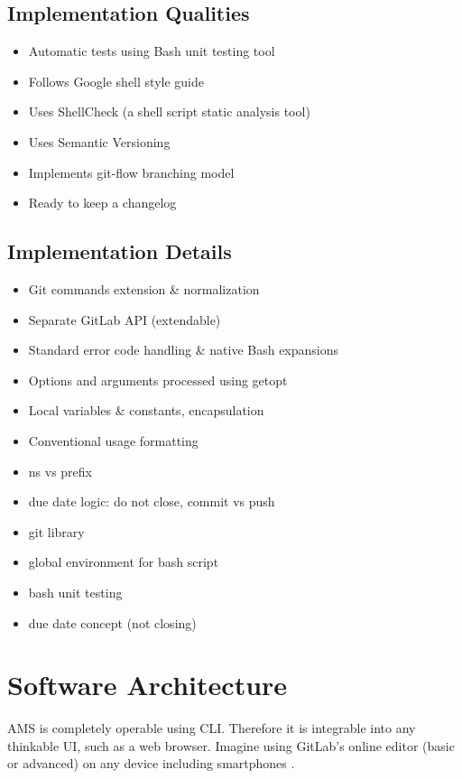 \subsection{Implementation Qualities}\label{ssec:implqaul}

\begin{itemize}
\item
  {Automatic tests using Bash unit testing tool}
\item
  {Follows Google shell style guide}
\item
  {Uses ShellCheck (a shell script static analysis tool)}
\item
  {Uses Semantic Versioning}
\item
  {Implements git-flow branching model}
\item
  {Ready to keep a changelog}
\end{itemize}

\subsection{Implementation Details}\label{sec:impldet}

\begin{itemize}
\item
  {Git commands extension \& normalization}
\item
  {Separate GitLab API (extendable)}
\item
  {Standard error code handling \& native Bash expansions}
\item
  {Options and arguments processed using getopt}
\item
  {Local variables \& constants, encapsulation}
\item
  {Conventional usage formatting}
\item
  {ns vs prefix}
\item
  {due date logic: do not close, commit vs push}
\item
  {git library}
\item
  {global environment for bash script}
\item
  {bash unit testing}
\item
  {due date concept (not closing)}
\end{itemize}

\section{Software Architecture}\label{sec:softarch}

{AMS is completely operable using CLI. Therefore it is integrable into any thinkable UI, such as a web browser. Imagine using GitLab's online editor (basic or advanced) on any device including smartphones \cite{10.1145/2325296.2325336}.}

